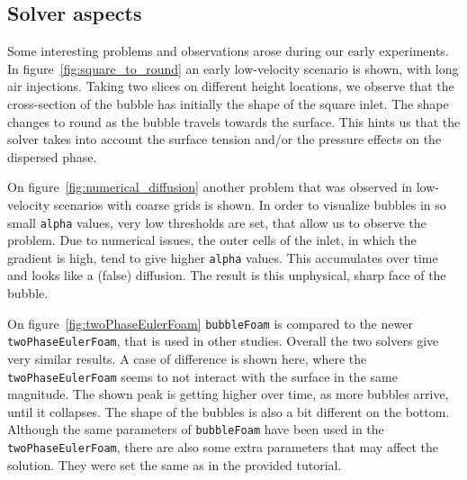 \documentclass[11pt, a4paper, twoside]{article}
\begin{document}
\subsection{Solver aspects}
Some interesting problems and observations arose during our early experiments. In figure~\ref{fig:square_to_round} an early low-velocity scenario is shown, with long air injections. Taking two slices on different height locations, we observe that the cross-section of the bubble has initially the shape of the square inlet. The shape changes to round as the bubble travels towards the surface. This hints us that the solver takes into account the surface tension and/or the pressure effects on the dispersed phase.

On figure~\ref{fig:numerical_diffusion} another problem that was observed in low-velocity scenarios with coarse grids is shown. In order to visualize bubbles in so small \texttt{alpha} values, very low thresholds are set, that allow us to observe the problem. Due to numerical issues, the outer cells of the inlet, in which the gradient is high, tend to give higher \texttt{alpha} values. This accumulates over time and looks like a (false) diffusion. The result is this unphysical, sharp face of the bubble.

On figure~\ref{fig:twoPhaseEulerFoam} \texttt{bubbleFoam} is compared to the newer \texttt{twoPhaseEulerFoam}, that is used in other studies. Overall the two solvers give very similar results. A case of difference is shown here, where the \texttt{twoPhaseEulerFoam} seems to not interact with the surface in the same magnitude. The shown peak is getting higher over time, as more bubbles arrive, until it collapses. The shape of the bubbles is also a bit different on the bottom. Although the same parameters of \texttt{bubbleFoam} have been used in the \texttt{twoPhaseEulerFoam}, there are also some extra parameters that may affect the solution. They were set the same as in the provided tutorial.
\end{document}
